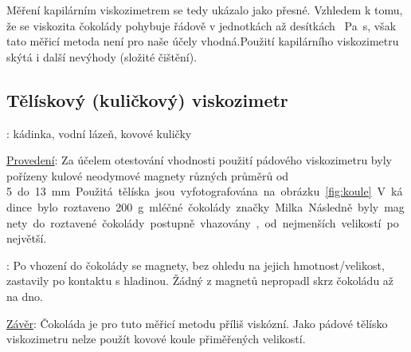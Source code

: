 \documentclass[12pt]{article}
\begin{document}
\par
Měření kapilárním viskozimetrem se tedy ukázalo jako přesné. Vzhledem k tomu, že se viskozita čokolády pohybuje řádově v jednotkách až desítkách \SI{}{\pascal\second}, však tato měřicí metoda není pro naše účely vhodná.\footnotemark\space Použití kapilárního viskozimetru skýtá i další nevýhody (složité čištění).

\subsection{Tělískový (kuličkový) viskozimetr}
\noindent \underline{}: kádinka, vodní lázeň, kovové kuličky
\par
\noindent \underline{Provedení}: Za účelem otestování vhodnosti použití pádového viskozimetru byly pořízeny kulové neodymové magnety různých průměrů od \SI{5} do \SI{13}{\milli\metre}. Použitá tělíska jsou vyfotografována na obrázku \ref{fig:koule}. V~kádince bylo roztaveno \SI{200}{\gram} mléčné čokolády značky Milka. Následně byly magnety do roztavené čokolády postupně vhazovány, od nejmenších velikostí po největší.
\par
\underline{}: Po vhození do čokolády se magnety, bez ohledu na jejich hmotnost/velikost, zastavily po kontaktu s hladinou. Žádný z magnetů nepropadl skrz čokoládu až na dno.
\par
\underline{Závěr}: Čokoláda je pro tuto měřicí metodu příliš viskózní. Jako pádové tělísko viskozimetru nelze použít kovové koule přiměřených velikostí.
\end{document}
